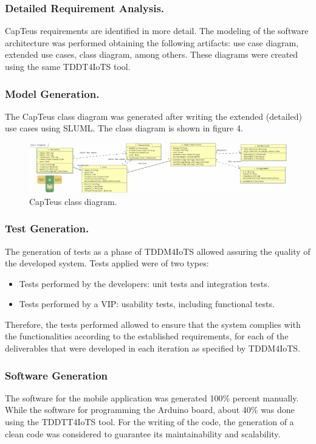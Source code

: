 \documentclass{svproc}
\begin{document}
\subsubsection{Detailed Requirement Analysis.} CapTeus requirements are identified in more detail. The modeling of the software architecture was performed obtaining the following artifacts: use case diagram, extended use cases, class diagram, among others. These diagrams were created
using the same TDDT4IoTS tool.

\subsubsection{Model Generation.} The CapTeus class diagram was generated after writing the extended (detailed) use cases using SLUML. The class diagram is shown in figure 4.

\begin{figure}[h!]
	\includegraphics[scale=1.05]{fig4.pdf}
	\centering
	\caption{CapTeus class diagram.}
	\label{fig:fig4}
\end{figure}

\subsubsection{Test Generation.} The generation of tests as a phase of TDDM4IoTS allowed assuring the quality of the developed system. Tests applied were of two types:

\begin{itemize}
	\item Tests performed by the developers: unit tests and integration tests.
	\item Tests performed by a VIP: usability tests, including functional tests.
\end{itemize}

Therefore, the tests performed allowed to ensure that the system complies
with the functionalities according to the established requirements, for each of the
deliverables that were developed in each iteration as specified by TDDM4IoTS.

\subsubsection{Software Generation}
The software for the mobile application was generated 100\% percent manually.
While the software for programming the Arduino board, about 40\% was done
using the TDDTT4IoTS tool. For the writing of the code, the generation of a
clean code was considered to guarantee its maintainability and scalability.
\end{document}
